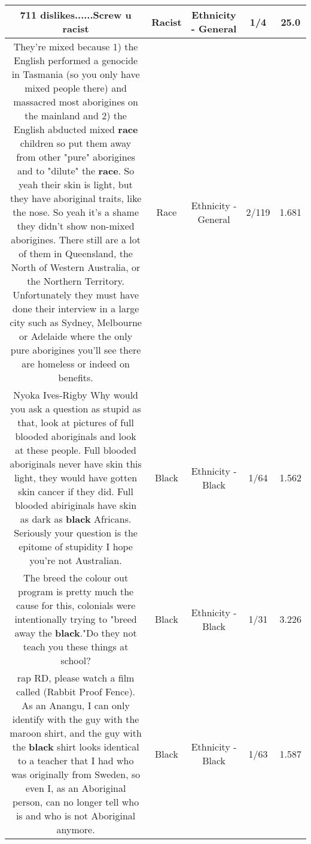 \documentclass[11pt]{article}
\newlength\mylength
\begin{document}
\begin{center}
\begin{longtable}{|C{.65\mylength}|C{.30\mylength}|C{.12\mylength}|C{.12\mylength}|C{.12\mylength}|}
  \small 711 dislikes......Screw u racist\normalsize   & Racist & Ethnicity - General & 1/4 & 25.0 \\  \hline
  \small They're mixed because 1) the English performed a genocide in Tasmania (so you only have mixed people there) and massacred most aborigines on the mainland and 2) the English abducted mixed \textbf{race} children so put them away from other "pure" aborigines and to "dilute" the \textbf{race}. So yeah their skin is light, but they have aboriginal traits, like the nose. So yeah it's a shame they didn't show non-mixed aborigines. There still are a lot of them in Queensland, the North of Western Australia, or the Northern Territory. Unfortunately they must have done their interview in a large city such as Sydney, Melbourne or Adelaide where the only pure aborigines you'll see there are homeless or indeed on benefits.\normalsize   & Race & Ethnicity - General & 2/119 & 1.681 \\  \hline
  \small Nyoka Ives-Rigby Why would you ask a question as stupid as that, look at pictures of full blooded aboriginals and look at these people. Full blooded aboriginals never have skin this light, they would have gotten skin cancer if they did. Full blooded abiriginals have skin as dark as \textbf{black} Africans. Seriously your question is the epitome of stupidity I hope you're not Australian.\normalsize   & Black & Ethnicity - Black & 1/64 & 1.562 \\  \hline
  \small The breed the colour out program is pretty much the cause for this, colonials were intentionally trying to "breed away the \textbf{black}."Do they not teach you these things at school?\normalsize   & Black & Ethnicity - Black & 1/31 & 3.226 \\  \hline
  \small rap RD, please watch a film called (Rabbit Proof Fence). As an Anangu, I can only identify with the guy with the maroon shirt, and the guy with the \textbf{black} shirt looks identical to a teacher that I had who was originally from Sweden, so even I, as an Aboriginal person, can no longer tell who is and who is not Aboriginal anymore.\normalsize   & Black & Ethnicity - Black & 1/63 & 1.587 \\  \hline

\end{longtable}
\end{center}
\end{document}
